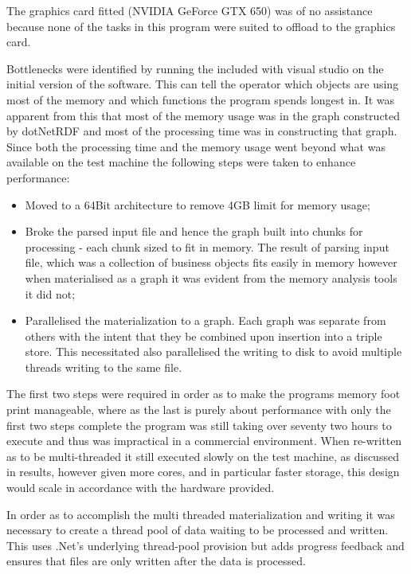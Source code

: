The graphics card fitted (NVIDIA GeForce GTX 650) was of no assistance because none of the tasks in this program were suited to offload to the graphics card.

Bottlenecks were identified by running the  included with visual studio on the initial version of the software. This can tell the operator which objects are using most of the memory and which functions the program spends longest in. It was apparent from this that most of the memory usage was in the graph constructed by dotNetRDF and most of the processing time was in constructing that graph. Since both the processing time and the memory usage went beyond what was available on the test machine the following steps were taken to enhance performance:
\begin{itemize}
	\item Moved to a 64Bit architecture to remove 4GB limit for memory usage;
	\item Broke the parsed input file and hence the graph built into chunks for processing - each chunk sized to fit in memory. The result of parsing input file, which was a collection of business objects fits easily in memory however when materialised as a graph it was evident from the memory analysis tools it did not;
	\item Parallelised the materialization to a graph. Each graph was separate from others with the intent that they be combined upon insertion into a triple store. This necessitated also parallelised the writing to disk to avoid multiple threads writing to the same file. 
\end{itemize}
 
 The first two steps were required in order as to make the programs memory foot print manageable, where as the last is purely about performance with only the first two steps complete the program was still taking over seventy two hours to execute and thus was impractical in a commercial environment. When re-written as to be multi-threaded it still executed slowly on the test machine, as discussed in results, however given more cores, and in particular faster storage, this design would scale in accordance with the hardware provided.

 In order as to accomplish the multi threaded materialization and writing it was necessary to create a thread pool of data waiting to be processed and written. This uses .Net's underlying thread-pool provision but adds progress feedback and ensures that files are only written after the data is processed.

